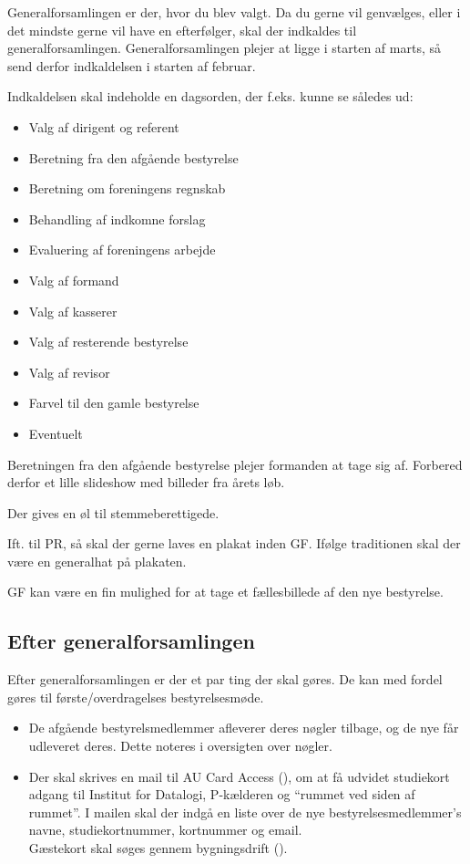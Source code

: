 Generalforsamlingen er der, hvor du blev valgt. Da du gerne vil
genvælges, eller i det mindste gerne vil have en efterfølger, skal der
indkaldes til generalforsamlingen. Generalforsamlingen plejer at ligge
i starten af marts, så send derfor indkaldelsen i starten af februar.

Indkaldelsen skal indeholde en dagsorden, der f.eks. kunne se således
ud:
\begin{itemize}
    \item Valg af dirigent og referent
    \item Beretning fra den afgående bestyrelse
    \item Beretning om foreningens regnskab
    \item Behandling af indkomne forslag
    \item Evaluering af foreningens arbejde
    \item Valg af formand
    \item Valg af kasserer
    \item Valg af resterende bestyrelse
    \item Valg af revisor
    \item Farvel til den gamle bestyrelse
    \item Eventuelt
\end{itemize}

Beretningen fra den afgående bestyrelse plejer formanden at tage sig
af. Forbered derfor et lille slideshow med billeder fra årets løb.

Der gives en øl til stemmeberettigede.

Ift. til PR, så skal der gerne laves en plakat inden GF. Ifølge
traditionen skal der være en generalhat på plakaten.

GF kan være en fin mulighed for at tage et fællesbillede af den nye
bestyrelse.

\subsection{Efter generalforsamlingen}

Efter generalforsamlingen er der et par ting der skal gøres. De kan med fordel gøres
til første/overdragelses bestyrelsesmøde.
\begin{itemize}
    \item De afgående bestyrelsmedlemmer afleverer deres nøgler tilbage, og de nye får
    udleveret deres. Dette noteres i oversigten over nøgler.
    \item Der skal skrives en mail til AU Card Access (), om
    at få udvidet studiekort adgang til Institut for Datalogi, P-kælderen og ``rummet ved 
    siden af rummet''. I mailen skal der indgå en liste over de nye bestyrelsesmedlemmer's
    navne, studiekortnummer, kortnummer og email.\\
    Gæstekort skal søges gennem bygningsdrift ().
\end{itemize}

